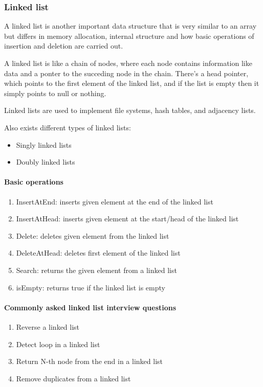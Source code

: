 \subsubsection{Linked list}
A linked list is another important data structure that is very similar to an array but differs in memory allocation, internal structure and how basic operations of insertion and deletion are carried out.

A linked list is like a chain of nodes, where each node contains information like data and a ponter to the succeding node in the chain. There's a head pointer, which points to the first element of the linked list, and if the list is empty then it simply points to null or nothing.

Linked lists are used to implement file systems, hash tables, and adjacency lists.

Also exists different types of linked lists:
\begin{itemize}
    \item { Singly linked lists }
    \item { Doubly linked lists }
\end{itemize}

\paragraph{Basic operations}
\begin{enumerate}
    \item { InsertAtEnd: inserts given element at the end of the linked list }
    \item { InsertAtHead: inserts given element at the start/head of the linked list }
    \item { Delete: deletes given element from the linked list }
    \item { DeleteAtHead: deletes first element of the linked list }
    \item { Search: returns the given element from a linked list }
    \item { isEmpty: returns true if the linked list is empty }
\end{enumerate}

\paragraph{Commonly asked linked list interview questions}
\begin{enumerate}
    \item Reverse a linked list
    \item Detect loop in a linked list
    \item Return N-th node from the end in a linked list
    \item Remove duplicates from a linked list
\end{enumerate}

